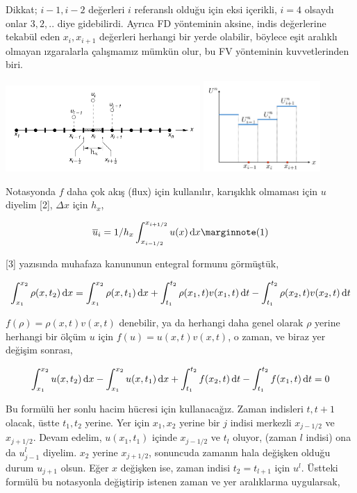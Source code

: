 \documentclass[12pt,fleqn]{article}\usepackage{../../common}
\begin{document}
Dikkat; $i-1,i-2$ değerleri $i$ referanslı olduğu için eksi içerikli, $i=4$
olsaydı onlar $3,2,..$ diye gidebilirdi. Ayrıca FD yönteminin aksine, indis
değerlerine tekabül eden $x_i,x_{i+1}$ değerleri herhangi bir yerde olabilir,
böylece eşit aralıklı olmayan ızgaralarla çalışmamız mümkün olur, bu FV
yönteminin kuvvetlerinden biri.

\includegraphics[width=20em]{12-20-00.png}
\includegraphics[width=12em]{12-19-02.png}

Notasyonda $f$ daha çok akış (flux) için kullanılır, karışıklık olmaması
için $u$ diyelim [2], $\Delta x$ için $h_x$,

$$
\overline{u}_i = 1/h_x \int_{x_{i-1/2}}^{x_{i+1/2}} u(x) \ud x
\mlabel{1}
$$

[3] yazısında muhafaza kanununun entegral formunu görmüştük,

$$
\int _{x_1}^{x_2} \rho(x,t_2) \,\mathrm{d} x =
\int _{x_1}^{x_2} \rho(x,t_1) \,\mathrm{d} x  +
\int_{t_1}^{t_2} \rho(x_1,t) v(x_1,t) \,\mathrm{d} t -
\int_{t_1}^{t_2}  \rho(x_2,t) v(x_2,t) \,\mathrm{d} t
$$

$f(\rho) = \rho(x,t) v(x,t)$ denebilir, ya da herhangi daha genel olarak $\rho$
yerine herhangi bir ölçüm $u$ için $f(u) = u(x,t) v(x,t)$, o zaman, ve
biraz yer değişim sonrası,

$$
\int_{x_1}^{x_2} u(x,t_2) \,\mathrm{d} x -
\int_{x_1}^{x_2} u(x,t_1) \,\mathrm{d} x  +
\int_{t_1}^{t_2} f(x_2,t) \,\mathrm{d} t  -
\int_{t_1}^{t_2} f(x_1,t) \,\mathrm{d} t = 0
$$

Bu formülü her sonlu hacim hücresi için kullanacağız. Zaman indisleri $t,t+1$
olacak, üstte $t_1,t_2$ yerine. Yer için $x_1,x_2$ yerine bir $j$ indisi
merkezli $x_{j-1/2}$ ve $x_{j+1/2}$. Devam edelim, $u(x_1,t_1)$ içinde
$x_{j-1/2}$ ve $t_l$ oluyor, (zaman $l$ indisi) ona da $u_{j-1}^l$
diyelim. $x_2$ yerine $x_{j+1/2}$, sonuncuda zamanın hala değişken olduğu durum
$u_{j+1}$ olsun. Eğer $x$ değişken ise, zaman indisi $t_2 = t_{l+1}$ için
$u^{l}$. Üstteki formülü bu notasyonla değiştirip istenen zaman ve yer
aralıklarına uygularsak,
\end{document}
